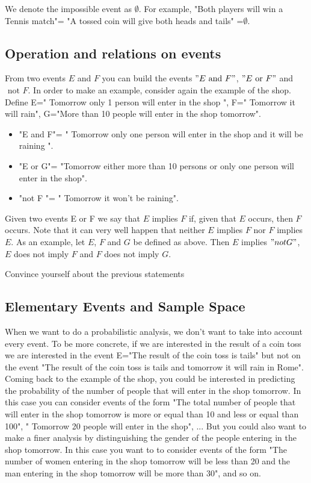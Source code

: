 \documentclass[12pt]{article}
\newcommand{\<}{{\langle \!\! \langle}}
\renewcommand{\>}{{\rangle \!\! \rangle}}
\newcommand{\commento}[1]{
	\par\noindent
	\colorbox{light}{\begin{minipage}{120 mm}#1\end{minipage}}
	\par\noindent
}
\begin{document}
\commento{We denote the impossible event as $\emptyset$. For example, "Both players will win a Tennis match"= "A tossed coin will give both heads and tails" =$ \emptyset$.}

\subsection{Operation and relations on events}

From two events $E$ and $F$ you can build the events $"E \textrm{ and }   F"$, $ "E \textrm{ or } F"$ and $ \textrm{ not } F$. In order to make an example, consider again the example of the shop. Define E=" Tomorrow only 1 person will enter in the shop ", F=" Tomorrow it will rain", G="More than 10 people will enter in the shop tomorrow". 

\begin{itemize}

	\item "E and F"= " Tomorrow only one person will enter in the shop and it will be raining ".
	\item "E or G"= "Tomorrow either more than 10 persons or only one person will enter in the shop".
	\item "not F "= " Tomorrow it won't be raining".

\end{itemize}

Given two events E or F we say that $E$ implies $F$ if, given that $E$ occurs, then $F$ occurs. Note that it can very well happen that neither $E$ implies $F$ nor $F$ implies $E$. As an example, let $E$, $F$ and $G$ be defined as above. Then $E$ implies $"not G"$, $E$ does not imply $F$ and $F$ does not imply $G$. 

\begin{exercise}
Convince yourself about the previous statements
\end{exercise}   
 

\subsection{Elementary Events and Sample Space}

When we want to do a probabilistic analysis, we don't want to take into account every event. To be more concrete, if we are interested in the result of a coin toss we are interested in the event E="The result of the coin toss is tails" but not on the event "The result of the coin toss is tails and tomorrow it will rain in Rome".\\
 Coming back to the example of the shop, you could be interested in predicting the probability of the number of people that will enter in the shop tomorrow. In this case you can consider events of the form "The total number of people that will enter in the shop tomorrow is more or equal than 10 and less or equal than 100", " Tomorrow 20 people will enter in the shop", ... But you could also  want to make a finer analysis by distinguishing the gender of the people entering in the shop tomorrow. In this case you want to to consider events of the form "The number of women entering in the shop tomorrow will be less than 20 and the man entering in the shop tomorrow will be more than 30", and so on.
\end{document}
